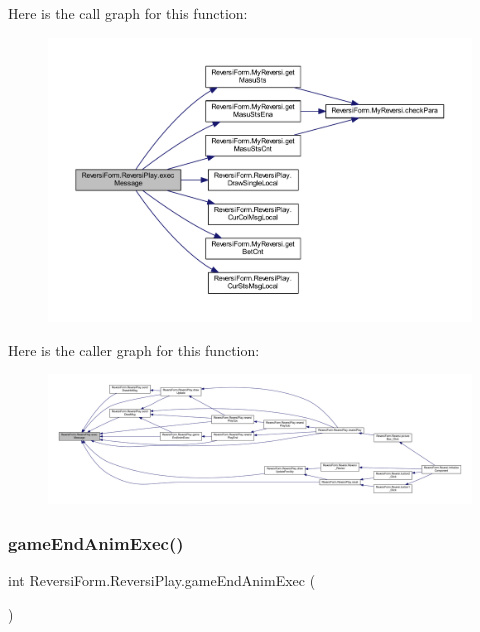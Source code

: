 Here is the call graph for this function\+:
\nopagebreak
\begin{figure}[H]
\begin{center}
\leavevmode
\includegraphics[width=350pt]{class_reversi_form_1_1_reversi_play_aa7cf1089065bff85997d057210312ae8_cgraph}
\end{center}
\end{figure}
Here is the caller graph for this function\+:
\nopagebreak
\begin{figure}[H]
\begin{center}
\leavevmode
\includegraphics[width=350pt]{class_reversi_form_1_1_reversi_play_aa7cf1089065bff85997d057210312ae8_icgraph}
\end{center}
\end{figure}
\mbox{\label{class_reversi_form_1_1_reversi_play_aec95b109a53b3cdab6466a4fca52f967}} 
\subsubsection{\texorpdfstring{game\+End\+Anim\+Exec()}{gameEndAnimExec()}}
{\footnotesize\ttfamily int Reversi\+Form.\+Reversi\+Play.\+game\+End\+Anim\+Exec (\begin{DoxyParamCaption}{ }\end{DoxyParamCaption})}



